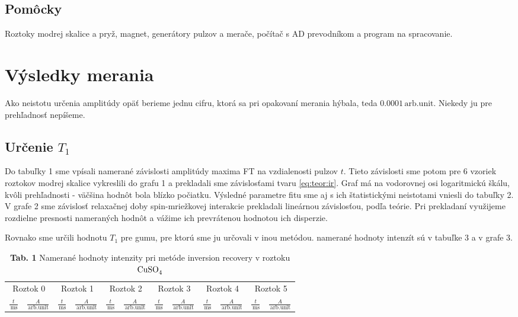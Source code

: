 \documentclass[a4paper, 10pt]{article}
\newcommand{\unit}[1]{\ensuremath{\, \mathrm{#1}}}
\begin{document}
\subsection*{Pomôcky}
Roztoky modrej skalice a pryž, magnet, generátory pulzov a merače, počítač s AD prevodníkom a program na spracovanie.
\section*{Výsledky merania}
Ako neistotu určenia amplitúdy opäť berieme jednu cifru, ktorá sa pri opakovaní merania hýbala, teda $0.0001\unit{arb. unit}$. Niekedy ju pre prehľadnosť nepíšeme.
\subsection*{Určenie $T_1$}
Do tabuľky 1 sme vpísali namerané závislosti amplitúdy maxima FT na vzdialenosti pulzov $t$. Tieto závislosti sme potom pre 6 vzoriek roztokov modrej skalice vykreslili do grafu 1 a prekladali sme závislosťami tvaru \ref{eq:teor:ir}. Graf má na vodorovnej osi logaritmickú škálu, kvôli prehľadnosti - väčšina hodnôt bola blízko počiatku. Výsledné parametre fitu sme aj s ich štatistickými neistotami vniesli do tabuľky 2. V grafe 2 sme závislosť relaxačnej doby spin-mriežkovej interakcie prekladali lineárnou závislosťou, podľa teórie. Pri prekladaní využijeme rozdielne presnosti nameraných hodnôt a vážime ich prevrátenou hodnotou ich disperzie.


Rovnako sme určili hodnotu $T_1$ pre gumu, pre ktorú sme ju určovali v \cite{predch} inou metódou. namerané hodnoty intenzít sú v tabuľke 3 a v grafe 3.
\begin{table}[h!]
\centering
\begin{tabular}{c|c||c|c||c|c||c|c||c|c||c|c}
\multicolumn{2}{c||}{Roztok 0} & 
\multicolumn{2}{c||}{Roztok 1} & 
\multicolumn{2}{c||}{Roztok 2} & 
\multicolumn{2}{c||}{Roztok 3} & 
\multicolumn{2}{c||}{Roztok 4} & 
\multicolumn{2}{c}{Roztok 5} 
\\
$ \frac{t}{\unit{ms}} $ & 
$ \frac{A}{\unit{arb. unit}}$ &
$ \frac{t}{\unit{ms}} $ & 
$ \frac{A}{\unit{arb. unit}}$ &
$ \frac{t}{\unit{ms}} $ & 
$ \frac{A}{\unit{arb. unit}}$ &
$ \frac{t}{\unit{ms}} $ & 
$ \frac{A}{\unit{arb. unit}}$ &
$ \frac{t}{\unit{ms}} $ & 
$ \frac{A}{\unit{arb. unit}}$ &
$ \frac{t}{\unit{ms}} $ & 
$ \frac{A}{\unit{arb. unit}}$ 
\\
\midrule 

\end{tabular}
\newline
\vspace*{2pt}
\caption*{\textbf{ Tab. 1} Namerané hodnoty intenzity pri metóde inversion recovery v roztoku $\ce{CuSO4}$}
\end{table}
\end{document}
